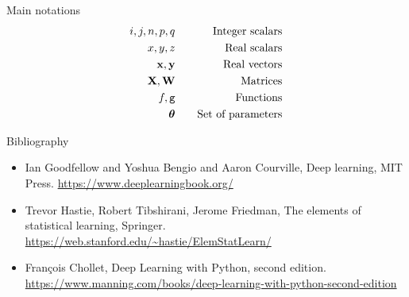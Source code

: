 \documentclass[xcolor=pdftex,dvipsnames,table,mathserif]{beamer}
\begin{document}

\begin{frame}{Main notations}
  \begin{eqnarray*}
    i, j, n, p, q & \hspace{1em} & \text{Integer scalars} \\
    x, y, z & \hspace{1em} & \text{Real scalars} \\
    \mathbf{x}, \mathbf{y} & \hspace{1em} & \text{Real vectors} \\
    \mathbf{X}, \mathbf{W} & \hspace{1em} & \text{Matrices} \\
    f, \texttt{g} & \hspace{1em} & \text{Functions} \\
    \boldsymbol{\theta} & \hspace{1em} & \text{Set of parameters} \\
    \end{eqnarray*}
\end{frame}


\begin{frame}{Bibliography}

  \begin{itemize}
  \item Ian Goodfellow and Yoshua Bengio and Aaron Courville, Deep learning, MIT Press. \url{https://www.deeplearningbook.org/}

  \item Trevor Hastie, Robert Tibshirani, Jerome Friedman, The elements of statistical learning, Springer. \url{https://web.stanford.edu/~hastie/ElemStatLearn/}

  \item François Chollet, Deep Learning with Python, second edition. \url{https://www.manning.com/books/deep-learning-with-python-second-edition}

  \end{itemize}
\end{frame}












\end{document}
